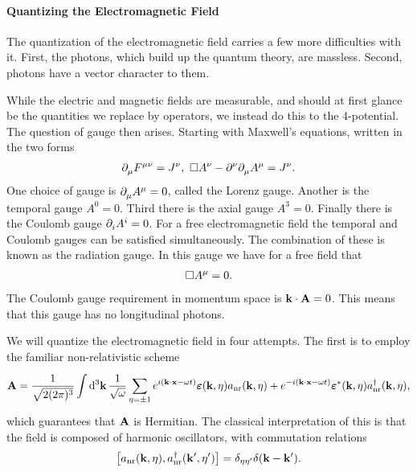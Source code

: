 \paragraph{Quantizing the Electromagnetic Field}
The quantization of the electromagnetic field carries a few more difficulties with it. First, the photons, which build up the quantum theory, are massless. Second, photons have a vector character to them.

While the electric and magnetic fields are measurable, and should at first glance be the quantities we replace by operators, we instead do this to the 4-potential. The question of gauge then arises. Starting with Maxwell's equations, written in the two forms
\begin{align*}
	\partial^{}_{\mu}F^{\mu\nu} = J^{\nu},\ \square A^{\nu} - \partial^{\nu}_{}\partial^{}_{\mu}A^{\mu} = J^{\nu}.
\end{align*}
One choice of gauge is $\partial^{}_{\mu}A^{\mu} = 0$, called the Lorenz gauge. Another is the temporal gauge $A^{0} = 0$. Third there is the axial gauge $A^{3} = 0$. Finally there is the Coulomb gauge $\partial^{}_{i}A^{i} = 0$. For a free electromagnetic field the temporal and Coulomb gauges can be satisfied simultaneously. The combination of these is known as the radiation gauge. In this gauge we have for a free field that
\begin{align*}
	\square A^{\mu} = 0.
\end{align*}
The Coulomb gauge requirement in momentum space is $\vb{k}\cdot\vb{A} = 0$. This means that this gauge has no longitudinal photons.

We will quantize the electromagnetic field in four attempts. The first is to employ the familiar non-relativistic scheme
\begin{align*}
	\vb{A} = \frac{1}{\sqrt{2(2\pi)^{3}}}\int\limits_{}^{}\dd[3]{\vb{k}}\frac{1}{\sqrt{\omega}}\sum\limits_{\eta = \pm 1}e^{i(\vb{k}\cdot\vb{x} - \omega t)}\vb*{\varepsilon}(\vb{k}, \eta)a_{\text{nr}}(\vb{k}, \eta) + e^{-i(\vb{k}\cdot\vb{x} - \omega t)}\vb*{\varepsilon}^{*}(\vb{k}, \eta)a_{\text{nr}}^{\dagger}(\vb{k}, \eta),
\end{align*}
which guarantees that $\vb{A}$ is Hermitian. The classical interpretation of this is that the field is composed of harmonic oscillators, with commutation relations
\begin{align*}
	\comm{a_{\text{nr}}(\vb{k}, \eta)}{a_{\text{nr}}\adj(\vb{k}\p, \eta\p)} = \delta_{\eta\eta\p}\delta(\vb{k} - \vb{k}\p).
\end{align*}


